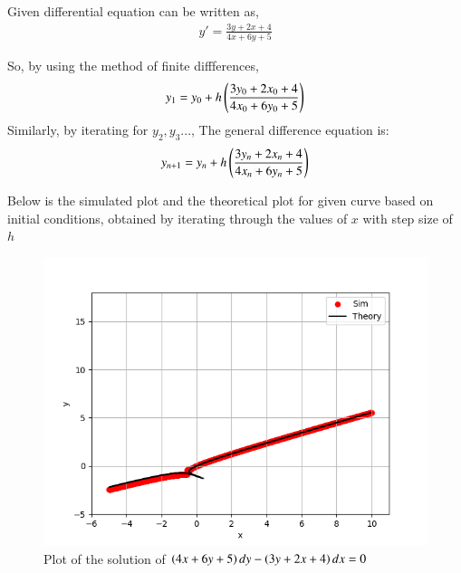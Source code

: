 \documentclass[journal]{IEEEtran}
\begin{document}
Given differential equation can be written as,
\begin{align}
	y\prime = \frac{3y + 2x + 4}{4x + 6y + 5}   
\end{align}

So, by using the method of finite diffferences,
\begin{align}
	y_1 = y_0 + h \left(\frac{3y_0 + 2x_0 + 4}{4x_0 + 6y_0 + 5}\right)
\end{align}
Similarly, by iterating for $y_2, y_3$...,
The general difference equation is:
\begin{align}
	y_{n+1} = y_n + h \left(\frac{3y_n + 2x_n + 4}{4x_n + 6y_n + 5}\right)
\end{align}

Below is the simulated plot and the theoretical plot for given curve  based on initial conditions, obtained by iterating through the values of $x$ with step size of $h$
\begin{figure}[h!]
	\centering
	\includegraphics[width=1\columnwidth]{figs/simulated.png}
	\caption{Plot of the solution of $\left(4x + 6y + 5\right)dy - \left(3y + 2x + 4\right)dx = 0$}
	\label{stemplot}
\end{figure}
\end{document}
